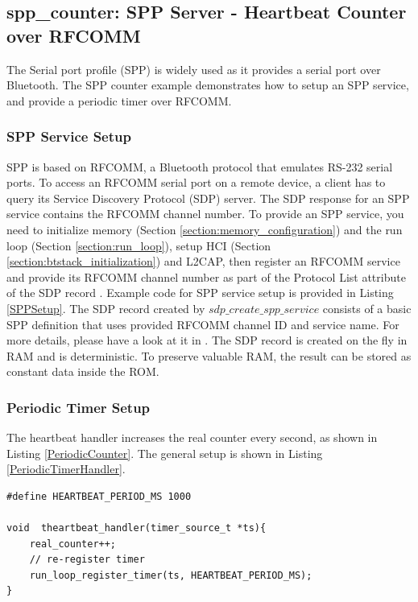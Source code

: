 \documentclass[a4paper,titlepage,oneside,12pt]{amsart} %
\begin{document}
\subsection {spp\_counter: SPP Server - Heartbeat Counter over RFCOMM}
\label{section:sppcounter}
    The Serial port profile (SPP) is widely used as it provides a serial port over Bluetooth. The SPP counter example demonstrates how to setup an SPP service, and provide a periodic timer over RFCOMM. 
    
 \subsubsection{SPP Service Setup}
    
    SPP is based on RFCOMM, a Bluetooth protocol that emulates RS-232 serial ports. To access an RFCOMM serial port on a remote device, a client has to query its Service Discovery Protocol (SDP) server. The SDP response for an SPP service contains the RFCOMM channel number. To provide an SPP service, you need to initialize memory (Section \ref{section:memory_configuration}) and the run loop (Section \ref{section:run_loop}), setup HCI (Section \ref{section:btstack_initialization}) and L2CAP, then register an RFCOMM service and provide its RFCOMM channel number as part of the Protocol List attribute of the SDP record . Example code for SPP service setup is provided in Listing \ref{SPPSetup}. The SDP record created by $sdp\_create\_spp\_service$ consists of a basic SPP definition that uses provided RFCOMM channel ID and service name. For more details, please have a look at it in . The SDP record is created on the fly in RAM and is deterministic. To preserve valuable RAM, the result can be stored as constant data inside the ROM.

    
\subsubsection{Periodic Timer Setup}

The heartbeat handler increases the real counter every second, as shown in Listing \ref{PeriodicCounter}. The general setup is shown in Listing \ref{PeriodicTimerHandler}.

\begin{lstlisting}[float, caption=Periodic counter, label=PeriodicCounter]
#define HEARTBEAT_PERIOD_MS 1000

void  theartbeat_handler(timer_source_t *ts){
    real_counter++;
    // re-register timer
    run_loop_register_timer(ts, HEARTBEAT_PERIOD_MS);
} 

\end{lstlisting}
\end{document}
